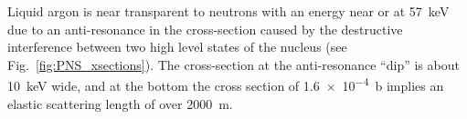 



Liquid argon is near transparent to neutrons with an energy near or at \SI{57}{\keV} due to an anti-resonance in the cross-section caused by the destructive interference between two high level states of the  nucleus (see Fig.~\ref{fig:PNS_xsections}). The cross-section at the anti-resonance ``dip'' is about \SI{10}{\keV} wide, and at the bottom the cross section of \SI{1.6e-4}{\barn} implies an elastic scattering length of over \SI{2000}{\m}. %

